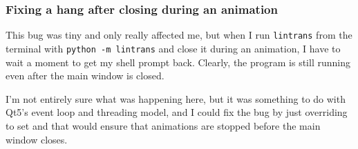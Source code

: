 \documentclass[../development.tex]{subfiles}
\begin{document}
\subsubsection{Fixing a hang after closing during an animation\label{development:teacher-suggestions:fixing-a-hang-after-closing-during-an-animation}}

This bug was tiny and only really affected me, but when I run \texttt{lintrans} from the terminal with \texttt{python -m lintrans} and close it during an animation, I have to wait a moment to get my shell prompt back. Clearly, the program is still running even after the main window is closed.

I'm not entirely sure what was happening here, but it was something to do with Qt5's event loop and threading model, and I could fix the bug by just overriding  to set  and that would ensure that animations are stopped before the main window closes.

\end{document}
